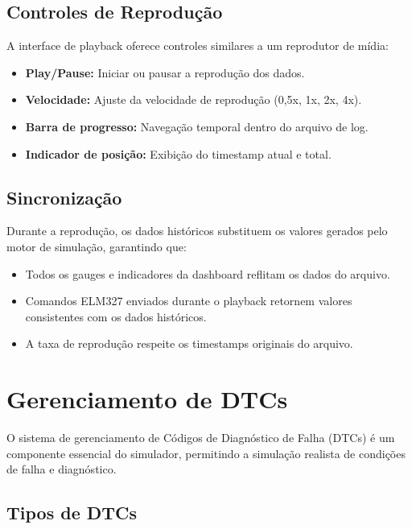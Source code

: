 \subsection{Controles de Reprodução}

A interface de playback oferece controles similares a um reprodutor de mídia:

\begin{itemize}
    \item \textbf{Play/Pause:} Iniciar ou pausar a reprodução dos dados.
    \item \textbf{Velocidade:} Ajuste da velocidade de reprodução (0,5x, 1x, 2x, 4x).
    \item \textbf{Barra de progresso:} Navegação temporal dentro do arquivo de log.
    \item \textbf{Indicador de posição:} Exibição do timestamp atual e total.
\end{itemize}

\subsection{Sincronização}

Durante a reprodução, os dados históricos substituem os valores gerados pelo motor de simulação, garantindo que:
\begin{itemize}
    \item Todos os gauges e indicadores da dashboard reflitam os dados do arquivo.
    \item Comandos ELM327 enviados durante o playback retornem valores consistentes com os dados históricos.
    \item A taxa de reprodução respeite os timestamps originais do arquivo.
\end{itemize}

\section{Gerenciamento de DTCs}
\label{sec:dtcs}

O sistema de gerenciamento de Códigos de Diagnóstico de Falha (DTCs) é um componente essencial do simulador, permitindo a simulação realista de condições de falha e diagnóstico.

\subsection{Tipos de DTCs}

